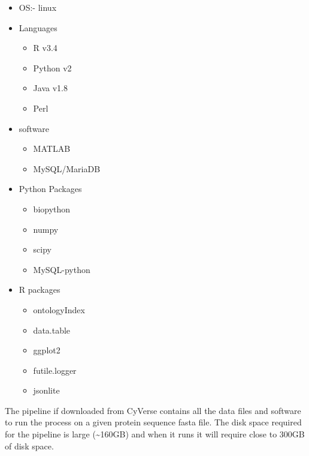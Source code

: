 \documentclass[11pt,letterpaper]{article}
\begin{document}
\begin{itemize}
 \item OS:- linux

 \item Languages
 \begin{itemize}
   \item R v3.4
   \item Python v2
   \item Java v1.8
   \item Perl
 \end{itemize}

 \item software
 \begin{itemize}
   \item MATLAB
   \item MySQL/MariaDB
 \end{itemize}

 \item Python Packages
 \begin{itemize}
  \item biopython
  \item numpy
  \item scipy
  \item MySQL-python
 \end{itemize}

 \item R packages
 \begin{itemize}
  \item ontologyIndex
  \item data.table
  \item ggplot2
  \item futile.logger
  \item jsonlite
 \end{itemize}

\end{itemize}

The pipeline if downloaded from CyVerse contains all the data files and software to run the process on a given protein sequence fasta file. The disk space required for the pipeline is large (\textasciitilde{}160GB) and when it runs it will require close to 300GB of disk space.
\end{document}
